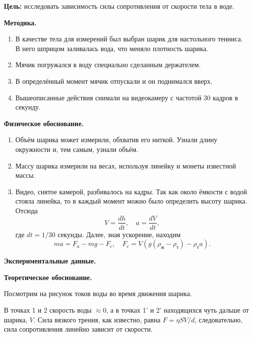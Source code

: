 \textbf{Цель:} исследовать зависимость силы сопротивления от скорости
тела в воде. 

\textbf{Методика.}

\begin{enumerate}
\item В качестве тела для измерений был выбран шарик для настольного
  тенниса. В него шприцом заливалась вода, что меняло плотность
  шарика.
\item Мячик погружался в воду специально сделанным держателем.
\item В определённый момент мячик отпускали и он поднимался вверх.
\item Вышеописанные действия снимали на видеокамеру с частотой 30
  кадров в секунду. 
\end{enumerate}

\textbf{Физическое обоснование.}

\begin{enumerate}
\item Объём шарика может измерили, обхватив его ниткой. Узнали длину
  окружности и, тем самым, узнали объём.
\item Массу шарика измерили на весах, используя линейку и монеты
  известной массы.
\item Видео, снятое камерой, разбивалось на кадры. Так как около
  ёмкости с водой стояла линейка, то в каждый момент можно было
  определить высоту шарика. Отсюда
  \begin{equation}
    \label{eq:bz_1}
    V = \frac{dh}{dt}, \quad a = \frac{dV}{dt},
  \end{equation}
  где $dt = 1/30$ секунды. Далее, зная ускорение, находим
  \begin{equation}
    \label{eq:bz_2}
    ma = F_a - mg - F_c, \quad F_c = V (g (\rho_{\mbox{ж}} -
    \rho_{\mbox{т}}) - \rho_{\mbox{т}} a). 
  \end{equation}
\end{enumerate}

\textbf{Экспериментальные данные. }


\textbf{Теоретическое обоснование. }

Посмотрим на рисунок токов воды во время движения шарика. 


В точках 1 и 2 скорость воды $\approx 0$, а в точках 1' и 2'
находящихся чуть дальше от шарика, $V$. Сила вязкого трения, как
известно, равна $F = \eta S V /d$, следовательно, сила сопротивления
линейно зависит от скорости. 

